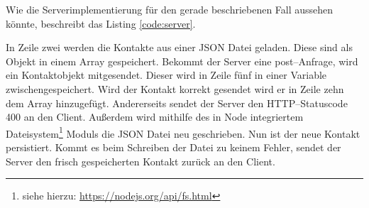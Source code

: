 Wie die Serverimplementierung für den gerade beschriebenen Fall aussehen könnte, beschreibt das Listing \ref{code:server}.
%
\begin{center}  
\end{center}
%
In Zeile zwei werden die Kontakte aus einer \gls{JSON} Datei geladen. Diese sind als Objekt in einem Array gespeichert. Bekommt der Server eine post--Anfrage, wird ein Kontaktobjekt mitgesendet. Dieser wird in Zeile fünf in einer Variable zwischengespeichert. 
Wird der Kontakt korrekt gesendet wird er in Zeile zehn dem Array hinzugefügt. Andererseits sendet der Server den \gls{HTTP}--Statuscode 400 an den Client. %
Außerdem wird mithilfe des in Node integriertem Dateisystem\footnote{siehe hierzu: \url{https://nodejs.org/api/fs.html}} Moduls die \gls{JSON} Datei neu geschrieben. Nun ist der neue Kontakt persistiert. Kommt es beim Schreiben der Datei zu keinem Fehler, sendet der Server den frisch gespeicherten Kontakt zurück an den Client.